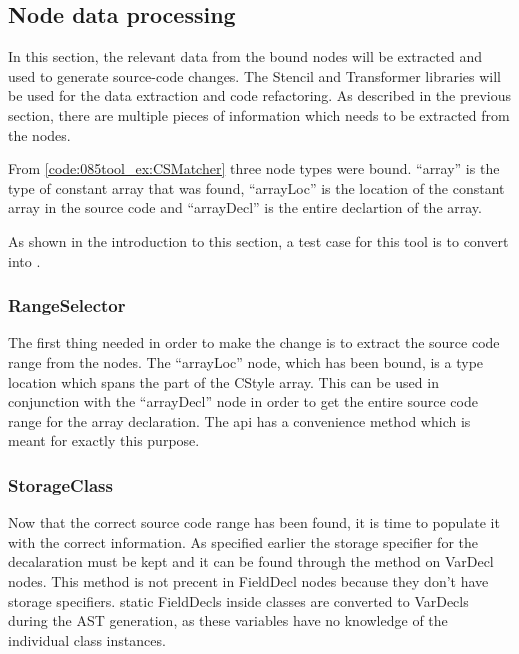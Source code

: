 \subsection{Node data processing}

In this section, the relevant data from the bound nodes will be extracted and used to generate source-code changes. The Stencil and Transformer libraries will be used for the data extraction and code refactoring.
As described in the previous section, there are multiple pieces of information which needs to be extracted from the nodes. 

From \cref{code:085tool_ex:CSMatcher} three node types were bound. ``array'' is the type of constant array that was found, ``arrayLoc'' is the location of the constant array in the source code and ``arrayDecl'' is the entire declartion of the array.

As shown in the introduction to this section, a test case for this tool is to convert  into .

\subsubsection*{RangeSelector}
The first thing needed in order to make the change is to extract the source code range from the nodes. The ``arrayLoc'' node, which has been bound, is a type location which spans the \cppinline{[2]} part of the CStyle array. This can be used in conjunction with the ``arrayDecl'' node in order to get the entire source code range for the array declaration. The  api has a convenience method  which is meant for exactly this purpose.

\subsubsection*{StorageClass}
Now that the correct source code range has been found, it is time to populate it with the correct information. As specified earlier the storage specifier for the decalaration must be kept and it can be found through the  method on VarDecl nodes. This method is not precent in FieldDecl nodes because they don't have storage specifiers. static FieldDecls inside classes are converted to VarDecls during the AST generation, as these variables have no knowledge of the individual class instances. 


